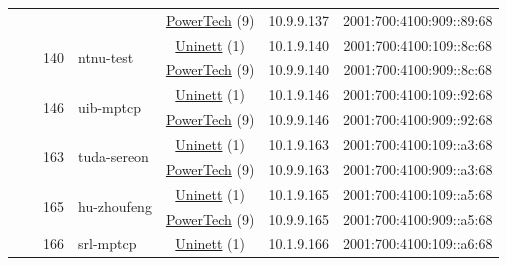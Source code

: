 \begin{small}
\begin{center}
\begin{longtable}{|c|c|c|c|c|c|c|c|}
  &  &  &  & \multicolumn{2}{|c|}{\tiny{\href{http://www.powertech.no}{PowerTech} (9)}} & \tiny{10.9.9.137} & \tiny{2001:700:4100:909::89:68} \\* \cline{3-3}\cline{4-4}\cline{5-5}\cline{6-6}\cline{7-7}\cline{8-8}
  &  & \multirow{2}{*}{\tiny{140}} & \multicolumn{1}{|l|}{\multirow{2}{*}{\tiny{ntnu-test}}} & \multicolumn{2}{|c|}{\tiny{\href{https://www.uninett.no}{Uninett} (1)}} & \tiny{10.1.9.140} & \tiny{2001:700:4100:109::8c:68} \\* \cline{5-5}\cline{6-6}\cline{7-7}\cline{8-8}
  &  &  &  & \multicolumn{2}{|c|}{\tiny{\href{http://www.powertech.no}{PowerTech} (9)}} & \tiny{10.9.9.140} & \tiny{2001:700:4100:909::8c:68} \\* \cline{3-3}\cline{4-4}\cline{5-5}\cline{6-6}\cline{7-7}\cline{8-8}
  &  & \multirow{2}{*}{\tiny{146}} & \multicolumn{1}{|l|}{\multirow{2}{*}{\tiny{uib-mptcp}}} & \multicolumn{2}{|c|}{\tiny{\href{https://www.uninett.no}{Uninett} (1)}} & \tiny{10.1.9.146} & \tiny{2001:700:4100:109::92:68} \\* \cline{5-5}\cline{6-6}\cline{7-7}\cline{8-8}
  &  &  &  & \multicolumn{2}{|c|}{\tiny{\href{http://www.powertech.no}{PowerTech} (9)}} & \tiny{10.9.9.146} & \tiny{2001:700:4100:909::92:68} \\* \cline{3-3}\cline{4-4}\cline{5-5}\cline{6-6}\cline{7-7}\cline{8-8}
  &  & \multirow{2}{*}{\tiny{163}} & \multicolumn{1}{|l|}{\multirow{2}{*}{\tiny{tuda-sereon}}} & \multicolumn{2}{|c|}{\tiny{\href{https://www.uninett.no}{Uninett} (1)}} & \tiny{10.1.9.163} & \tiny{2001:700:4100:109::a3:68} \\* \cline{5-5}\cline{6-6}\cline{7-7}\cline{8-8}
  &  &  &  & \multicolumn{2}{|c|}{\tiny{\href{http://www.powertech.no}{PowerTech} (9)}} & \tiny{10.9.9.163} & \tiny{2001:700:4100:909::a3:68} \\* \cline{3-3}\cline{4-4}\cline{5-5}\cline{6-6}\cline{7-7}\cline{8-8}
  &  & \multirow{2}{*}{\tiny{165}} & \multicolumn{1}{|l|}{\multirow{2}{*}{\tiny{hu-zhoufeng}}} & \multicolumn{2}{|c|}{\tiny{\href{https://www.uninett.no}{Uninett} (1)}} & \tiny{10.1.9.165} & \tiny{2001:700:4100:109::a5:68} \\* \cline{5-5}\cline{6-6}\cline{7-7}\cline{8-8}
  &  &  &  & \multicolumn{2}{|c|}{\tiny{\href{http://www.powertech.no}{PowerTech} (9)}} & \tiny{10.9.9.165} & \tiny{2001:700:4100:909::a5:68} \\* \cline{3-3}\cline{4-4}\cline{5-5}\cline{6-6}\cline{7-7}\cline{8-8}
  &  & \multirow{2}{*}{\tiny{166}} & \multicolumn{1}{|l|}{\multirow{2}{*}{\tiny{srl-mptcp}}} & \multicolumn{2}{|c|}{\tiny{\href{https://www.uninett.no}{Uninett} (1)}} & \tiny{10.1.9.166} & \tiny{2001:700:4100:109::a6:68} \\* \cline{5-5}\cline{6-6}\cline{7-7}\cline{8-8}

\end{longtable}
\end{center}
\end{small}
